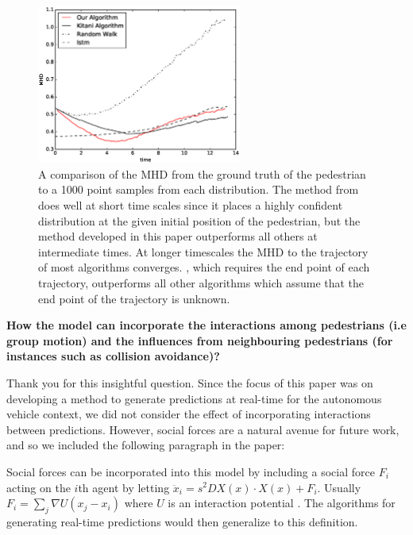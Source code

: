 \documentclass[usenames,dvipsnames]{article}
\providecommand{\response}[1]{
\noindent
\noindent\colorbox{gray!20}{
\parbox{\textwidth}{
\setlength{\parskip}{.1in}
\setlength{\parindent}{.1in}
#1}
}
}
\begin{document}
\begin{enumerate}
\begin{item}
\end{item}
\begin{figure}
	\centering
	\includegraphics[width=0.6\textwidth]{figures/mhd_results.eps}
	\caption{A comparison of the MHD from the ground truth of the pedestrian to a 1000 point samples from each distribution. The method from \cite{Alahi2016} does well at short time scales since it places a highly confident distribution at the given initial position of the pedestrian, but the method developed in this paper outperforms all others at intermediate times. At longer timescales the MHD to the trajectory of most algorithms converges. \cite{Kitani2012}, which requires the end point of each trajectory, outperforms all other algorithms which assume that the end point of the trajectory is unknown.}
   \reversemarginpar{}
	\label{MHD}
\end{figure}

\begin{item}
\textbf{How the model can incorporate the interactions among pedestrians (i.e
group motion) and the influences from neighbouring pedestrians (for
instances such as collision avoidance)?}
\end{item}

Thank you for this insightful question. 
Since the focus of this paper was on developing a method to generate predictions at real-time for the autonomous vehicle context, we did not consider the effect of incorporating interactions between predictions. 
However, social forces are a natural avenue for future work, and so we included the following paragraph in the paper:

\reversemarginpar{}
\response{Social forces can be incorporated into this model by
	including a social force $F_{i}$ acting on the $i$th agent by letting $\ddot{x}_i = s^2 DX(x) \cdot X(x) + F_i$.  
	Usually $F_{i} = \sum_{j} \nabla U( x_j - x_i)$ where $U$ is an interaction potential \cite{Helbing1995}. 
	The algorithms for generating real-time predictions would then generalize to this definition.
}



\end{enumerate}
\end{document}
